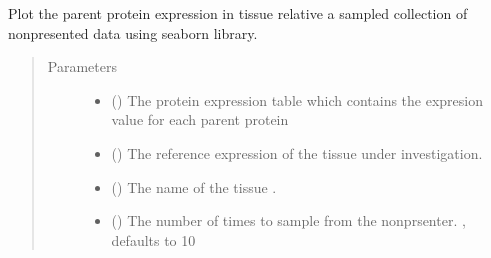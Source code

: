 \documentclass[letterpaper,10pt,english]{sphinxmanual}
\begin{document}
\begin{fulllineitems}
\label{\detokenize{IPTK.Visualization:IPTK.Visualization.vizTools.plot_parent_protein_expression_in_tissue}}
Plot the parent protein expression in tissue relative a sampled collection of non\sphinxhyphen{}presented data using seaborn library.
\begin{quote}\begin{description}
\item[{Parameters}] \leavevmode\begin{itemize}
\item {} 
 () \textendash{} The protein expression table which contains the expresion value for each parent protein

\item {} 
 () \textendash{} The reference expression of the tissue under investigation.

\item {} 
 () \textendash{} The name of the tissue .

\item {} 
 (\sphinxstyleliteralemphasis{\sphinxupquote{, }}) \textendash{} The number of times to sample from the non\sphinxhyphen{}prsenter. , defaults to 10


\end{itemize}
\end{description}
\end{quote}
\end{fulllineitems}
\end{document}
